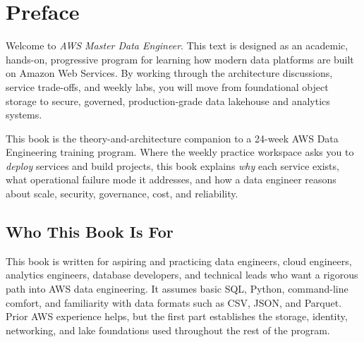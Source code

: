 \chapter*{Preface}
Welcome to \textit{AWS Master Data Engineer}. This text is designed as an academic, hands-on, progressive program for learning how modern data platforms are built on Amazon Web Services. By working through the architecture discussions, service trade-offs, and weekly labs, you will move from foundational object storage to secure, governed, production-grade data lakehouse and analytics systems.

This book is the theory-and-architecture companion to a 24-week AWS Data Engineering training program. Where the weekly practice workspace asks you to \emph{deploy} services and build projects, this book explains \emph{why} each service exists, what operational failure mode it addresses, and how a data engineer reasons about scale, security, governance, cost, and reliability.

\section*{Who This Book Is For}
This book is written for aspiring and practicing data engineers, cloud engineers, analytics engineers, database developers, and technical leads who want a rigorous path into AWS data engineering. It assumes basic SQL, Python, command-line comfort, and familiarity with data formats such as CSV, JSON, and Parquet. Prior AWS experience helps, but the first part establishes the storage, identity, networking, and lake foundations used throughout the rest of the program.

